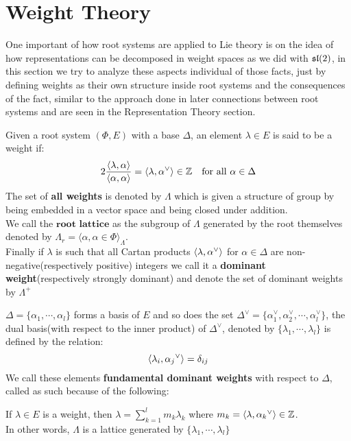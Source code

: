 \section{Weight Theory}
One important of how root systems are applied to Lie theory is on the idea of how representations can be decomposed in weight spaces as we did with $\mathfrak{sl}(2)$, in this section we try to analyze these aspects individual of those facts, just by defining weights as their own structure inside root systems and the consequences of the fact, similar to the approach done in \cite{humphreys1} later connections between root systems and  are seen in the Representation Theory section.\\
\begin{defi}
	Given a root system $(\Phi,E)$ with a base $\Delta$, an element $\lambda \in E$ is said to be a weight if:
	$$ 2\frac{\langle \lambda , \alpha \rangle}{\langle \alpha,\alpha\rangle } = \langle {\lambda},{\alpha}^\lor\rangle \in \mathbb{Z} \ \ \ \text{for all } \alpha \in \Delta$$
	The set of \textbf{all weights} is denoted by $\Lambda$ which is given a structure of group by being embedded in a vector space and being closed under addition. \\
	We call the $\textbf{root lattice}$ as the subgroup of $\Lambda$ generated by the root themselves denoted by $\Lambda_r = \langle \alpha, \alpha \in \Phi \rangle_\Lambda$.\\
	Finally if $\lambda$ is such that all Cartan products $\langle {\lambda},{\alpha}^\lor\rangle$ for $\alpha \in \Delta$ are non-negative(respectively positive) integers we call it a \textbf{dominant weight}(respectively strongly dominant) and denote the set of dominant weights by $\Lambda^+$
\end{defi}
$\Delta = \{\alpha_1,\cdots,\alpha_l\}$ forms a basis of $E$ and so does the set $\Delta^\lor = \{\alpha_1^\lor, \alpha_2^\lor , \cdots, \alpha_l^\lor \}$, the dual basis(with respect to the inner product) of $\Delta^\lor$, denoted by $\{\lambda_1,\cdots,\lambda_l\}$ is defined by the relation:
$$ \langle {\lambda_i},{\alpha_j}^\lor\rangle = \delta_{ij}$$
We call these elements \textbf{fundamental dominant weights} with respect to $\Delta$, called as such because of the following:
\begin{prop}
If $\lambda \in E$ is a weight, then $\lambda = \displaystyle\sum_{k=1}^l m_k\lambda_k$ where $m_k = \langle {\lambda},{\alpha_k}^\lor\rangle\in \mathbb{Z}$. \\ 
In other words, $\Lambda$ is a lattice generated by $\{\lambda_1,\cdots,\lambda_l\}$
\end{prop}
